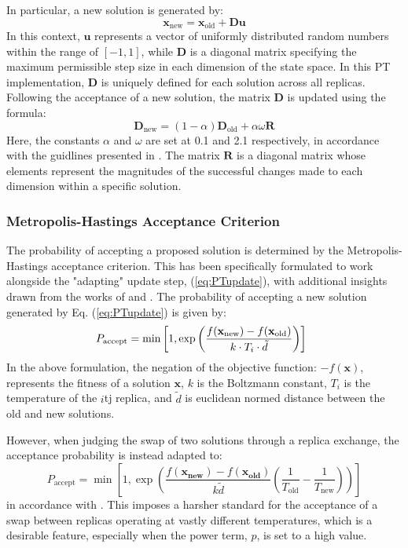 \documentclass[10pt]{article}
\begin{document}
\begin{multicols}{2}
In particular, a new solution is generated by:
\begin{equation}
\mathbf{x}_{\text{new}} = \mathbf{x}_{\text{old}} + \mathbf{D}\mathbf{u}
\label{eq:PTupdate}
\end{equation}
In this context, $\mathbf{u}$ represents a vector of uniformly distributed random numbers within the range of $[-1, 1]$, while $\mathbf{D}$ is a diagonal matrix specifying the maximum permissible step size in each dimension of the state space. In this PT implementation, $\mathbf{D}$ is uniquely defined for each solution across all replicas. Following the acceptance of a new solution, the matrix $\mathbf{D}$ is updated using the formula:
\[
\mathbf{D}_{\text{new}} = (1-\alpha)\mathbf{D}_{\text{old}} + \alpha \omega \mathbf{R}
\]
Here, the constants $\alpha$ and $\omega$ are set at 0.1 and 2.1 respectively, in accordance with the guidlines presented in \cite{NT90-A34350}. The matrix $\mathbf{R}$ is a diagonal matrix whose elements represent the magnitudes of the successful changes made to each dimension within a specific solution.

\subsubsection{Metropolis-Hastings Acceptance Criterion}
\label{sec:PT_MA}

The probability of accepting a proposed solution is determined by the Metropolis-Hastings acceptance criterion. This has been specifically formulated to work alongside the "adapting" update step, (\ref{eq:PTupdate}), with additional insights drawn from the works of \cite{NT90-A34350} and \cite{Neal_1996}. The probability of accepting a new solution generated by Eq. (\ref{eq:PTupdate}) is given by:
\[
    \hspace{-2mm}P_{\text{accept}} = \min\left[1, \exp\left(\frac{f(\mathbf{x_{\text{new}}}) - f(\mathbf{x_{\text{old}}})}{k \cdot T_i \cdot \tilde{d}}\right)\right]
\]
In the above formulation, the negation of the objective function: $-f(\mathbf{x})$, represents the fitness of a solution $\mathbf{x}$, $k$ is the Boltzmann constant, $T_i$ is the temperature of the $i$tj replica, and $\tilde{d}$ is euclidean normed distance between the old and new solutions.

However, when judging the swap of two solutions through a replica exchange, the acceptance probability is instead adapted to:
\[
    P_{\text{accept}} = \min\left[1, \exp\left(\frac{f(\mathbf{x_{\text{new}}}) - f(\mathbf{x_{\text{old}}})}{k \tilde{d}} \left(\frac{1}{T_{\text{old}}} - \frac{1}{T_{\text{new}}}\right)\right)\right]
\]
in accordance with \cite{Neal_1996}. This imposes a harsher standard for the acceptance of a swap between replicas operating at vastly different temperatures, which is a desirable feature, especially when the power term, $p$, is set to a high value.


\end{multicols}
\end{document}
